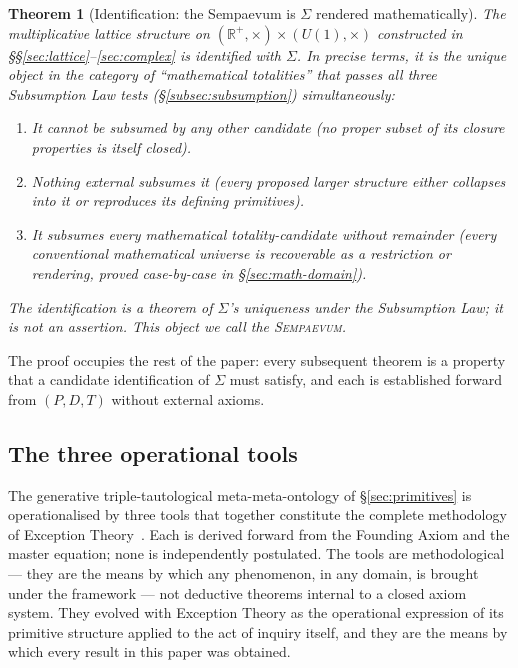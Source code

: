 \documentclass[11pt,a4paper]{article}
\newtheorem{theorem}{Theorem}[section]
\theoremstyle{definition}
\theoremstyle{remark}
\newcommand{\R}{\mathbb{R}}
\newcommand{\Sempaevum}{\textsc{Sempaevum}}
\begin{document}
\begin{theorem}[Identification: the Sempaevum is $\Sigma$ rendered mathematically]\label{thm:identification-Sigma}
The multiplicative lattice structure on $(\R^{+},\times)\times (U(1),\times)$ constructed in \S\S\ref{sec:lattice}--\ref{sec:complex} is identified with $\Sigma$. In precise terms, it is the unique object in the category of ``mathematical totalities'' that passes all three Subsumption Law tests (\S\ref{subsec:subsumption}) simultaneously:
\begin{enumerate}[label=(\roman*),leftmargin=*]
\item It cannot be subsumed by any other candidate (no proper subset of its closure properties is itself closed).
\item Nothing external subsumes it (every proposed larger structure either collapses into it or reproduces its defining primitives).
\item It subsumes every mathematical totality-candidate without remainder (every conventional mathematical universe is recoverable as a restriction or rendering, proved case-by-case in \S\ref{sec:math-domain}).
\end{enumerate}
The identification is a theorem of $\Sigma$'s uniqueness under the Subsumption Law; it is \emph{not} an assertion. This object we call the \Sempaevum.
\end{theorem}

The proof occupies the rest of the paper: every subsequent theorem is a property that a candidate identification of $\Sigma$ must satisfy, and each is established forward from $(P,D,T)$ without external axioms.


\subsection{The three operational tools}\label{subsec:three-tools}

The generative triple-tautological meta-meta-ontology of \S\ref{sec:primitives} is operationalised by three tools that together constitute the complete methodology of Exception Theory~\cite{ThreeTools}. Each is derived forward from the Founding Axiom and the master equation; none is independently postulated. The tools are methodological --- they are the means by which any phenomenon, in any domain, is brought under the framework --- not deductive theorems internal to a closed axiom system. They evolved with Exception Theory as the operational expression of its primitive structure applied to the act of inquiry itself, and they are the means by which every result in this paper was obtained.
\end{document}
